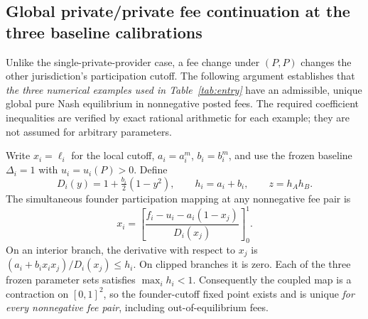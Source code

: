 \documentclass[11pt]{article}
\begin{document}
\subsection{Global private/private fee continuation at the three baseline calibrations}\label{app:pp-global}

Unlike the single-private-provider case, a fee change under $(P,P)$ changes the other jurisdiction's participation cutoff. The following argument establishes that \emph{the three numerical examples used in Table~\ref{tab:entry}} have an admissible, unique global pure Nash equilibrium in nonnegative posted fees. The required coefficient inequalities are verified by exact rational arithmetic for each example; they are not assumed for arbitrary parameters.

Write $x_i=\ell_i$ for the local cutoff, $a_i=a_i^m$, $b_i=b_i^m$, and use the frozen baseline $\Delta_i=1$ with $u_i=u_i(P)>0$. Define
\[
 D_i(y)=1+\tfrac{b_i}{2}(1-y^2),\qquad
 h_i=a_i+b_i,\qquad z=h_Ah_B.
\]
The simultaneous founder participation mapping at any nonnegative fee pair is
\begin{equation}
 x_i=\left[\frac{f_i-u_i-a_i(1-x_j)}{D_i(x_j)}\right]_0^1 .
 \label{eq:pp-clipped-cert}
\end{equation}
On an interior branch, the derivative with respect to $x_j$ is $(a_i+b_i x_i x_j)/D_i(x_j)\leq h_i$.
On clipped branches it is zero. Each of the three frozen parameter sets satisfies $\max_i h_i<1$. Consequently the coupled map is a contraction on $[0,1]^2$, so the founder-cutoff fixed point exists and is unique \emph{for every nonnegative fee pair}, including out-of-equilibrium fees.
\end{document}
